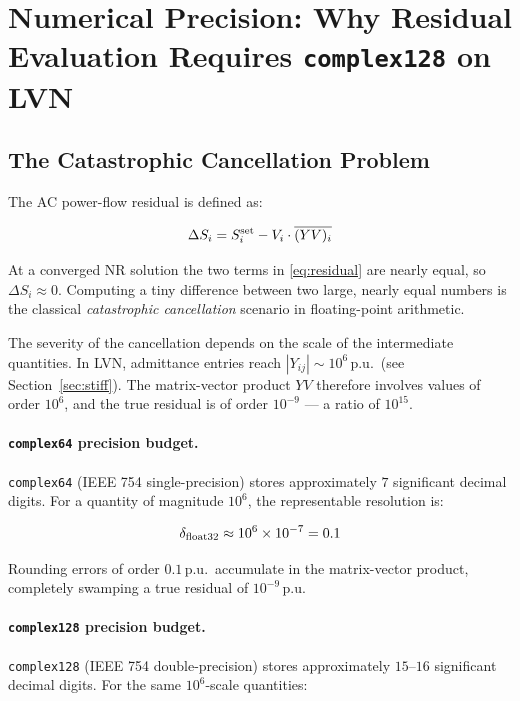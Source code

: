 \documentclass{article}
\begin{document}
\section{Numerical Precision: Why Residual Evaluation Requires
  \texttt{complex128} on LVN}

\subsection{The Catastrophic Cancellation Problem}

The AC power-flow residual is defined as:

\begin{equation}
  \Delta S_i = S_i^{\rm set} - V_i \cdot \overline{(YV)_i}
  \label{eq:residual}
\end{equation}

At a converged NR solution the two terms in \eqref{eq:residual} are
nearly equal, so $\Delta S_i \approx 0$.  Computing a tiny difference
between two large, nearly equal numbers is the classical
\emph{catastrophic cancellation} scenario in floating-point arithmetic.

The severity of the cancellation depends on the scale of the intermediate
quantities.  In LVN, admittance entries reach $|Y_{ij}| \sim 10^6$\,p.u.\
(see Section~\ref{sec:stiff}).  The matrix-vector product $YV$ therefore
involves values of order $10^6$, and the true residual is of order $10^{-9}$
--- a ratio of $10^{15}$.

\paragraph{\texttt{complex64} precision budget.}
\texttt{complex64} (IEEE 754 single-precision) stores approximately
$7$ significant decimal digits.  For a quantity of magnitude $10^6$,
the representable resolution is:

\begin{equation}
  \delta_{\rm float32} \approx 10^6 \times 10^{-7} = 0.1
\end{equation}

Rounding errors of order $0.1$\,p.u.\ accumulate in the matrix-vector
product, completely swamping a true residual of $10^{-9}$\,p.u.

\paragraph{\texttt{complex128} precision budget.}
\texttt{complex128} (IEEE 754 double-precision) stores approximately
$15$--$16$ significant decimal digits.  For the same $10^6$-scale
quantities:
\end{document}
